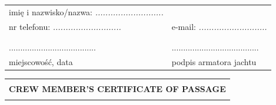\documentclass{article}
\begin{document}
\begin{tabularx}{\textwidth}{X X}
imię i nazwisko/nazwa: \textit{...........................} \\
nr telefonu: \textit{...........................} & e-mail: \textit{...........................}\\
\\\\
...................................... & ......................................\\
miejscowość, data & podpis armatora jachtu\\
\end{tabularx}
\newpage
\begin{tabularx}{\textwidth} { 
  | >{\centering\arraybackslash}X | }
 \hline
 \\
 \textbf{\huge CREW MEMBER'S CERTIFICATE OF PASSAGE} \\
 \\
\hline
\end{tabularx}
\end{document}
